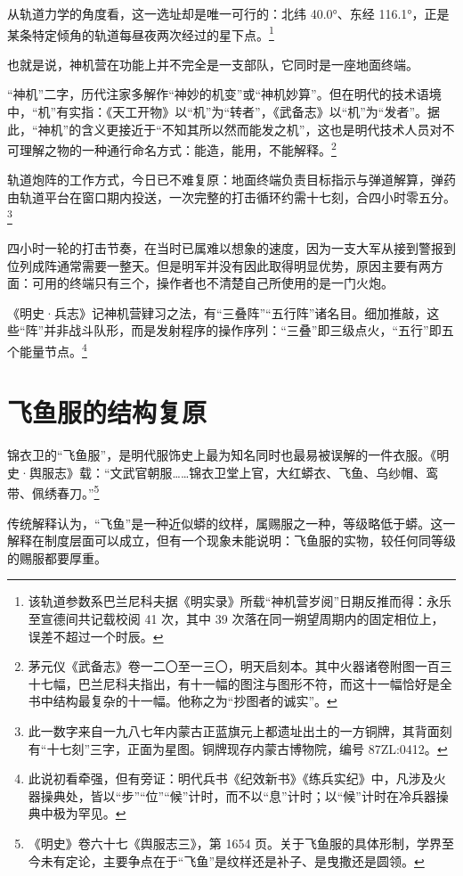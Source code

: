 从轨道力学的角度看，这一选址却是唯一可行的：北纬 40.0°、东经 116.1°，正是某条特定倾角的轨道每昼夜两次经过的星下点。\footnote{该轨道参数系巴兰尼科夫据《明实录》所载“神机营岁阅”日期反推而得：永乐至宣德间共记载校阅 41 次，其中 39 次落在同一朔望周期内的固定相位上，误差不超过一个时辰。}

也就是说，神机营在功能上并不完全是一支部队，它同时是一座地面终端。

“神机”二字，历代注家多解作“神妙的机变”或“神机妙算”。但在明代的技术语境中，“机”有实指：《天工开物》以“机”为“转者”，《武备志》以“机”为“发者”。据此，“神机”的含义更接近于“不知其所以然而能发之机”，这也是明代技术人员对不可理解之物的一种通行命名方式：能造，能用，不能解释。\footnote{茅元仪《武备志》卷一二〇至一三〇，明天启刻本。其中火器诸卷附图一百三十七幅，巴兰尼科夫指出，有十一幅的图注与图形不符，而这十一幅恰好是全书中结构最复杂的十一幅。他称之为“抄图者的诚实”。}

轨道炮阵的工作方式，今日已不难复原：地面终端负责目标指示与弹道解算，弹药由轨道平台在窗口期内投送，一次完整的打击循环约需十七刻，合四小时零五分。\footnote{此一数字来自一九八七年内蒙古正蓝旗元上都遗址出土的一方铜牌，其背面刻有“十七刻”三字，正面为星图。铜牌现存内蒙古博物院，编号 87ZL:0412。}

四小时一轮的打击节奏，在当时已属难以想象的速度，因为一支大军从接到警报到位列成阵通常需要一整天。但是明军并没有因此取得明显优势，原因主要有两方面：可用的终端只有三个，操作者也不清楚自己所使用的是一门火炮。

《明史·兵志》记神机营肄习之法，有“三叠阵”“五行阵”诸名目。细加推敲，这些“阵”并非战斗队形，而是发射程序的操作序列：“三叠”即三级点火，“五行”即五个能量节点。\footnote{此说初看牵强，但有旁证：明代兵书《纪效新书》《练兵实纪》中，凡涉及火器操典处，皆以“步”“位”“候”计时，而不以“息”计时；以“候”计时在冷兵器操典中极为罕见。}

\section{飞鱼服的结构复原}

锦衣卫的“飞鱼服”，是明代服饰史上最为知名同时也最易被误解的一件衣服。《明史·舆服志》载：“文武官朝服……锦衣卫堂上官，大红蟒衣、飞鱼、乌纱帽、鸾带、佩绣春刀。”\footnote{《明史》卷六十七《舆服志三》，第 1654 页。关于飞鱼服的具体形制，学界至今未有定论，主要争点在于“飞鱼”是纹样还是补子、是曳撒还是圆领。}

传统解释认为，“飞鱼”是一种近似蟒的纹样，属赐服之一种，等级略低于蟒。这一解释在制度层面可以成立，但有一个现象未能说明：飞鱼服的实物，较任何同等级的赐服都要厚重。

